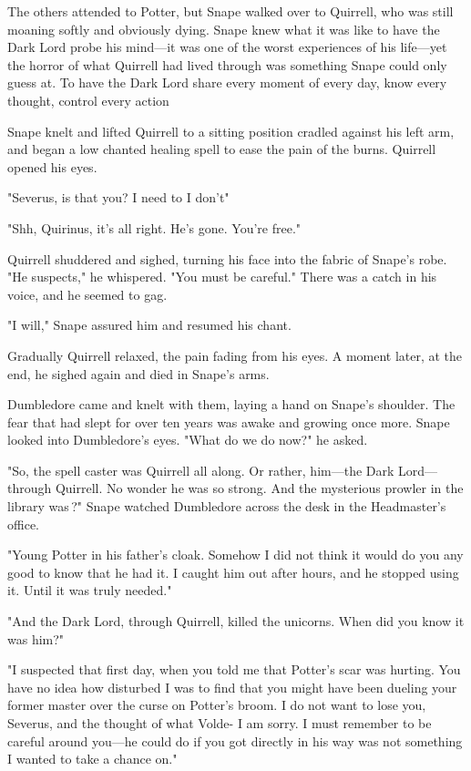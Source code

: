The others attended to Potter, but Snape walked over to Quirrell, who was still moaning softly and obviously dying. Snape knew what it was like to have the Dark Lord probe his mind—it was one of the worst experiences of his life—yet the horror of what Quirrell had lived through was something Snape could only guess at. To have the Dark Lord share every moment of every day, know every thought, control every action{\el}

Snape knelt and lifted Quirrell to a sitting position cradled against his left arm, and began a low chanted healing spell to ease the pain of the burns. Quirrell opened his eyes.

"Severus, is that you? I need to{\el} I don't{\el}"

"Shh, Quirinus, it's all right. He's gone. You're free."

Quirrell shuddered and sighed, turning his face into the fabric of Snape's robe. "He suspects," he whispered. "You must be careful." There was a catch in his voice, and he seemed to gag.

"I will," Snape assured him and resumed his chant.

Gradually Quirrell relaxed, the pain fading from his eyes. A moment later, at the end, he sighed again and died in Snape's arms.

Dumbledore came and knelt with them, laying a hand on Snape's shoulder. The fear that had slept for over ten years was awake and growing once more. Snape looked into Dumbledore's eyes. "What do we do now?" he asked.

\sbreak

"So, the spell caster was Quirrell all along. Or rather, him—the Dark Lord—through Quirrell. No wonder he was so strong. And the mysterious prowler in the library was{\el}\,?" Snape watched Dumbledore across the desk in the Headmaster's office.

"Young Potter in his father's cloak. Somehow I did not think it would do you any good to know that he had it. I caught him out after hours, and he stopped using it. Until it was truly needed."

"And the Dark Lord, through Quirrell, killed the unicorns. When did you know it was him?"

"I suspected that first day, when you told me that Potter's scar was hurting. You have no idea how disturbed I was to find that you might have been dueling your former master over the curse on Potter's broom. I do not want to lose you, Severus, and the thought of what Volde-{\el} I am sorry. I must remember to be careful around you{\el}—he could do if you got directly in his way was not something I wanted to take a chance on."

